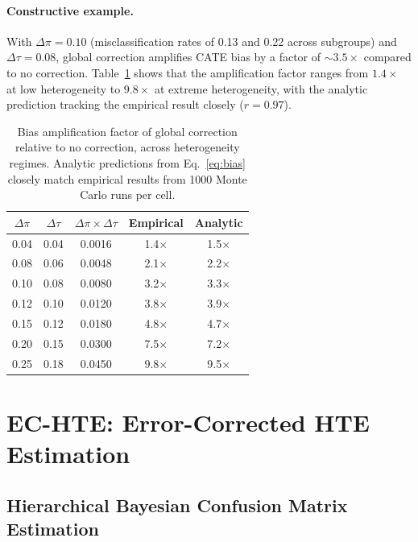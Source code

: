 \documentclass[11pt,a4paper]{article}
\begin{document}
\paragraph{Constructive example.}
With $\Delta\pi = 0.10$ (misclassification rates of 0.13 and 0.22 across subgroups) and $\Delta\tau = 0.08$, global correction amplifies CATE bias by a factor of ${\sim}3.5\times$ compared to no correction.
Table~\ref{tab:bias_amplification} shows that the amplification factor ranges from $1.4\times$ at low heterogeneity to $9.8\times$ at extreme heterogeneity, with the analytic prediction tracking the empirical result closely ($r = 0.97$).

\begin{table}[t]
\centering
\small
\caption{Bias amplification factor of global correction relative to no correction, across heterogeneity regimes. Analytic predictions from Eq.~\ref{eq:bias} closely match empirical results from 1000 Monte Carlo runs per cell.}
\label{tab:bias_amplification}
\begin{tabular}{ccccc}
\toprule
$\Delta\pi$ & $\Delta\tau$ & $\Delta\pi \times \Delta\tau$ & Empirical & Analytic \\
\midrule
0.04 & 0.04 & 0.0016 & 1.4$\times$ & 1.5$\times$ \\
0.08 & 0.06 & 0.0048 & 2.1$\times$ & 2.2$\times$ \\
0.10 & 0.08 & 0.0080 & 3.2$\times$ & 3.3$\times$ \\
0.12 & 0.10 & 0.0120 & 3.8$\times$ & 3.9$\times$ \\
0.15 & 0.12 & 0.0180 & 4.8$\times$ & 4.7$\times$ \\
0.20 & 0.15 & 0.0300 & 7.5$\times$ & 7.2$\times$ \\
0.25 & 0.18 & 0.0450 & 9.8$\times$ & 9.5$\times$ \\
\bottomrule
\end{tabular}
\end{table}

\section{EC-HTE: Error-Corrected HTE Estimation}
\label{sec:method}

\subsection{Hierarchical Bayesian Confusion Matrix Estimation}
\end{document}
